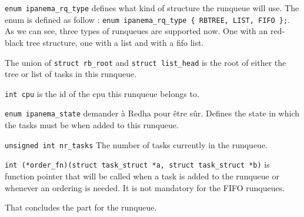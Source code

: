 \par \texttt{enum ipanema\_rq\_type} defines what kind of structure the runqueue will use. The enum is defined as follow : \texttt{enum ipanema\_rq\_type \{ RBTREE, LIST, FIFO \};}. As we can see, three types of runqueues are supported now. One with an red-black tree structure, one with a list and with a fifo list.
\par The union of \texttt{struct rb\_root} and \texttt{struct list\_head} is the root of either the tree or list of tasks in this runqueue.
\par \texttt{int cpu} is the id of the cpu this runqueue belongs to.
\par \texttt{enum ipanema\_state} demander à Redha pour être sûr. Defines the state in which the tasks must be when added to this runqueue.
\par \texttt{unsigned int nr\_tasks} The number of tasks currently in the runqueue.
\par \texttt{int (*order\_fn)(struct task\_struct *a, struct task\_struct *b)} is function pointer that will be called when a task is added to the runqueue or whenever an ordering is needed. It is not mandatory for the FIFO runqueues.


\par That concludes the part for the runqueue.